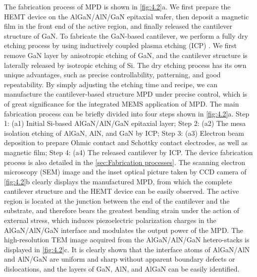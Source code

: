The  fabrication  process of MPD is shown in \autoref{fig:4.2}a. We first prepare the HEMT device on the AlGaN/AlN/GaN epitaxial wafer, then deposit a magnetic film  in the front end of the active  region, and finally released the cantilever  structure of GaN. To fabricate the GaN-based cantilever, we perform a fully dry etching process by using inductively coupled plasma etching (ICP) \cite{yang2015influence}. We first remove GaN layer by anisotropic etching  of GaN, and the cantilever structure is laterally released by isotropic etching  of Si. The dry etching  process has its own unique advantages, such as precise controllability, patterning, and good repeatability. By simply adjusting the etching time and recipe, we can manufacture the cantilever-based structure MPD under precise control, which is of great significance for the integrated MEMS application of MPD. The main fabrication process can be briefly divided into four steps shown in \autoref{fig:4.2}a. Step 1: (a1) Initial Si-based AlGaN/AlN/GaN epitaxial layer; Step 2: (a2) The mesa isolation  etching of AlGaN, AlN, and GaN by  ICP; Step 3: (a3) Electron beam deposition to prepare Ohmic contact and Schottky  contact  electrodes, as well as magnetic  film; Step 4: (a4) The released cantilever by ICP. The device fabrication process is also detailed in the \autoref{sec:Fabrication processes}. The scanning electron microscopy (SEM)  image and the inset optical picture taken by CCD camera of \autoref{fig:4.2}b clearly displays the manufactured MPD, from which the complete cantilever  structure and the HEMT  device can be easily observed. The active region is located at the junction between the end of the cantilever  and  the substrate, and therefore bears the greatest bending strain under the action of external stress, which induces piezoelectric polarization charges  in the AlGaN/AlN/GaN interface and modulates the output power of the MPD. The high-resolution TEM image acquired from the AlGaN/AlN/GaN hetero-stacks is displayed in \autoref{fig:4.2}c. It is clearly shown that the interface  atoms of AlGaN/AlN and AlN/GaN are uniform and sharp without apparent boundary defects or dislocations, and the layers of GaN, AlN, and AlGaN can be easily identified. 

